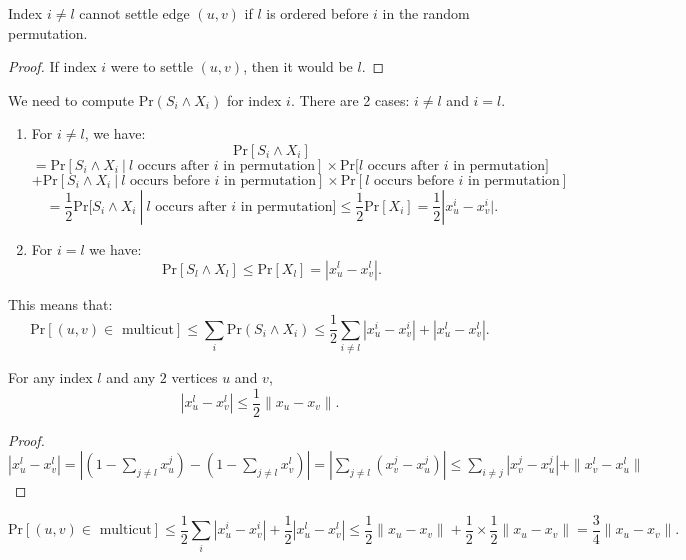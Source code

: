 \documentclass[../main/main.tex]{subfiles}
\begin{document}
\begin{claim}
	Index $i\neq l$ cannot settle edge $(u,v)$ if $l$ is ordered before $i$ in the random permutation.
\end{claim}
\begin{proof}
	If index $i$  were to settle $(u,v)$, then it would be $l$.
\end{proof}
We need to compute $\text{Pr}(S_i\wedge X_i)$ for index $i$. There are 2 cases: $i\neq l$ and $i=l$.
 \begin{enumerate}
	\item For $i\neq l$, we have:  \[
			\text{Pr}\left[ S_i\wedge X_i \right]\]\[ =\text{Pr}\left[ S_i\wedge X_i\ |\ l \text{ occurs after $i$ in permutation} \right] \times \text{Pr}[ l \text{ occurs after $i$ in permutation]} \]\[+ \text{Pr}\left[ S_i \wedge X_i\ |\ l\text{ occurs before $i$ in permutation} \right] \times \text{Pr}\left[ l \text{ occurs before $i$ in permutation} \right] 
			\] \[=\frac{1}{2}\text{Pr}[S_i \wedge X_i\ |\ l\text{ occurs after $i$ in permutation}] \le \frac{1}{2}\text{Pr}[X_i] = \frac{1}{2}|x_u^i-x_v^i|
	.\] 
\item For $i=l$ we have:  \[
		\text{Pr}[S_l \wedge X_l]\le  \text{Pr}[X_l]=|x_u^l-x_v^l|
.\]
\end{enumerate}
This means that: \[
	\text{Pr}\left[ (u,v)\in \text{ multicut} \right] \le \sum_i \text{Pr}(S_i \wedge X_i) \le 
	\frac{1}{2}\sum_{i\neq l} |x^i_u-x^i_v|+|x_u^l-x_v^l|
.\] 
\begin{lemma}
	For any index $l$ and any $2$ vertices $u$ and $v$, \[
	|x^l_u-x_v^l|\le \frac{1}{2}\|x_u-x_v\|
	.\] 
\end{lemma}
\begin{proof}
	$|x_u^l-x_v^l|=\left| \left(1-\sum\limits_{j\neq l} x^j_u\right) - \left( 1-\sum\limits_{j\neq l} x_v^l \right)  \right|=\left| \sum\limits_{j\neq l} \left( x_v^j-x_u^j \right)  \right| \le \sum\limits_{i\neq j} |x_v^j-x_u^j|+\|x_v^l-x_u^l\| $
\end{proof}
\[
\text{Pr}\left[ (u,v)\in \text{ multicut} \right]  \le 
\frac{1}{2}\sum_{i} |x^i_u-x^i_v|+ \frac{1}{2}|x_u^l-x_v^l|\le \frac{1}{2}\|x_u-x_v\|+\frac{1}{2}\times \frac{1}{2} \|x_u-x_v\|=\frac{3}{4}\|x_u-x_v\|
.\] 
\end{document}
